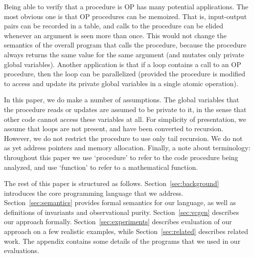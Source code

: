 Being able to verify that a procedure is OP has many potential
applications. The most obvious one is that OP procedures can be
memoized. That is, input-output pairs can be recorded in a table, and calls
to the procedure can be elided whenever an argument is seen more than
once. This would not change the semantics of the overall program that calls
the procedure, because the procedure always returns the same value for the
same argument (and mutates only private global variables). Another
application is that if a loop contains a call to an OP procedure, then the
loop can be parallelized (provided the procedure is modified to access and
update its private global variables in a single atomic operation).

In this paper, we do make a number of assumptions. The global variables
that the procedure reads or updates are assumed to be private to it, in the
sense that other code cannot access these variables at all.  For simplicity
of presentation, we assume that loops are not present, and have been
converted to recursion. However, we do not restrict the procedure to use
only tail recursion. We do not as yet address pointers and memory
allocation. Finally, a note about terminology: throughout this paper we
use `procedure' to refer to the code procedure being analyzed, and use
`function' to refer to a mathematical function. 

The rest of this paper is structured as
follows. Section~\ref{sec:background} introduces the core programming
language that we address. Section~\ref{sec:semantics} provides formal
semantics for our language, as well as definitions of invariants and
observational purity. Section~\ref{sec:vcgen} describes our approach
formally. Section~\ref{sec:experiments} describes evaluation of our
approach on a few realistic examples, while Section~\ref{sec:related}
describes related work. The appendix contains some details of the programs
that we used in our evaluations. 


